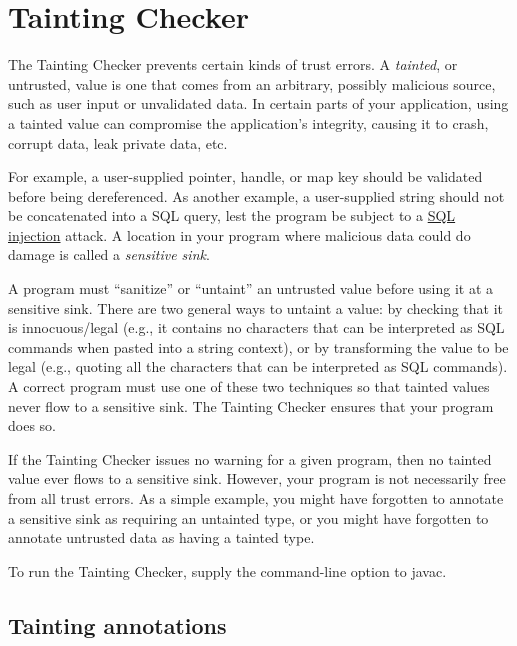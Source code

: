 \htmlhr
\chapter{Tainting Checker\label{tainting-checker}}

The Tainting Checker prevents certain kinds of trust errors.
A \emph{tainted}, or untrusted, value is one that comes from an arbitrary,
possibly malicious source, such as user input or unvalidated data.
In certain parts of your application, using a tainted value can compromise
the application's integrity, causing it to crash, corrupt data, leak
private data, etc.


For example, a user-supplied pointer, handle, or map key should be
validated before being dereferenced.
As another example, a user-supplied string should not be concatenated into a
SQL query, lest the program be subject to a 
\href{http://en.wikipedia.org/wiki/Sql_injection}{SQL injection} attack.
A location in your program where malicious data could do damage is
called a \emph{sensitive sink}.

A program must ``sanitize'' or ``untaint'' an untrusted value before using
it at a sensitive sink.  There are two general ways to untaint a value:
by checking
that it is innocuous/legal (e.g., it contains no characters that can be
interpreted as SQL commands when pasted into a string context), or by
transforming the value to be legal (e.g., quoting all the characters that
can be interpreted as SQL commands).  A correct program must use one of
these two techniques so that tainted values never flow to a sensitive sink.
The Tainting Checker ensures that your program does so.

If the Tainting Checker issues no warning for a given program, then no
tainted value ever flows to a sensitive sink.  However, your program is not
necessarily free from all trust errors.  As a simple example, you might
have forgotten to annotate a sensitive sink as requiring an untainted type,
or you might have forgotten to annotate untrusted data as having a tainted
type.

To run the Tainting Checker, supply the
command-line option to javac.


\section{Tainting annotations\label{tainting-annotations}}

